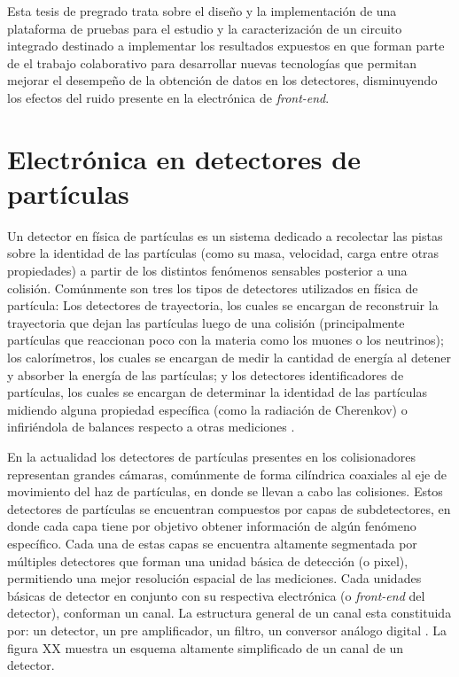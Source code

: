 Esta tesis de pregrado trata sobre el diseño y la implementación de una plataforma de pruebas para el estudio y  la caracterización de un circuito integrado destinado a implementar los resultados expuestos en \citep{diegothesis} que forman parte de el trabajo colaborativo para desarrollar nuevas tecnologías que permitan mejorar el desempeño de la obtención de datos en los detectores, disminuyendo los efectos del ruido presente en la electrónica de \textit{front-end}.

\section{Electrónica en detectores de partículas}

	 Un detector en física de partículas es un sistema dedicado a recolectar las pistas sobre la identidad de las partículas (como su masa, velocidad, carga entre otras propiedades) a partir de los distintos fenómenos sensables posterior a una colisión. Comúnmente son tres los tipos de detectores utilizados en física de partícula: Los detectores de trayectoria, los cuales se encargan de reconstruir la trayectoria que dejan las partículas luego de una colisión (principalmente partículas que reaccionan poco con la materia como los muones o los neutrinos); los calorímetros, los cuales se encargan de medir la cantidad de energía al detener y absorber la energía de las partículas; y los detectores identificadores de partículas, los cuales se encargan de determinar la identidad de las partículas midiendo alguna propiedad específica (como la radiación de Cherenkov) o infiriéndola de balances respecto a otras mediciones \citep{cern101}.

	En la actualidad los detectores de partículas presentes en los colisionadores representan  grandes cámaras, comúnmente de forma cilíndrica coaxiales al eje de movimiento del haz de partículas, en donde se llevan a cabo las colisiones. Estos detectores de partículas se encuentran compuestos por capas de subdetectores, en donde cada capa tiene por objetivo obtener información de algún fenómeno específico. Cada una de estas capas se encuentra altamente segmentada por múltiples detectores que forman una unidad básica de detección (o pixel), permitiendo una mejor resolución espacial de las mediciones. Cada unidades básicas de detector en conjunto con su respectiva electrónica (o \textit{front-end} del detector), conforman un canal. La estructura general de un canal esta constituida por: un detector, un pre amplificador, un filtro, un conversor análogo digital \citep{spieler2005semiconductor}. La figura XX muestra un esquema altamente simplificado de un canal de un detector.

